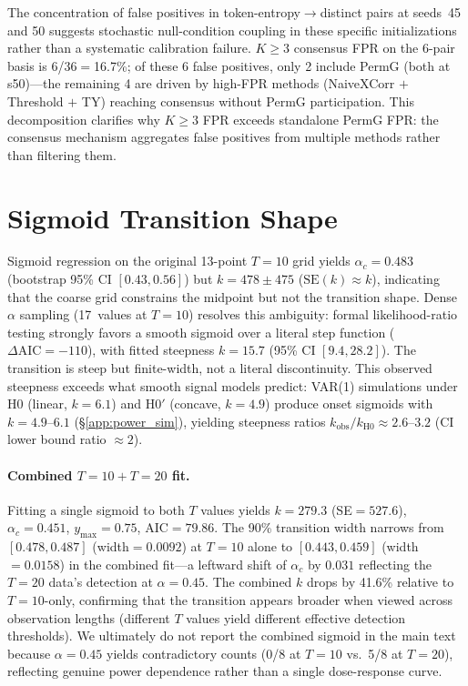 The concentration of false positives in token-entropy$\to$distinct pairs at seeds~45 and 50 suggests stochastic null-condition coupling in these specific initializations rather than a systematic calibration failure.
$K{\geq}3$ consensus FPR on the 6-pair basis is 6/36${=}$16.7\%; of these 6 false positives, only 2 include PermG (both at s50)---the remaining 4 are driven by high-FPR methods (NaiveXCorr $+$ Threshold $+$ TY) reaching consensus without PermG participation.
This decomposition clarifies why $K{\geq}3$ FPR exceeds standalone PermG FPR: the consensus mechanism aggregates false positives from multiple methods rather than filtering them.


\section{Sigmoid Transition Shape}
\label{app:sigmoid_shape}

Sigmoid regression on the original 13-point $T{=}10$ grid yields $\alpha_c = 0.483$ (bootstrap 95\% CI $[0.43, 0.56]$) but $k = 478 \pm 475$ ($\mathrm{SE}(k) \approx k$), indicating that the coarse grid constrains the midpoint but not the transition shape.
Dense $\alpha$ sampling (17~values at $T{=}10$) resolves this ambiguity: formal likelihood-ratio testing strongly favors a smooth sigmoid over a literal step function ($\Delta\mathrm{AIC}{=}-110$), with fitted steepness $k{=}15.7$ (95\% CI $[9.4, 28.2]$).
The transition is steep but finite-width, not a literal discontinuity.
This observed steepness exceeds what smooth signal models predict: VAR(1) simulations under H0 (linear, $k{=}6.1$) and H0$'$ (concave, $k{=}4.9$) produce onset sigmoids with $k{=}4.9$--$6.1$ (\S\ref{app:power_sim}), yielding steepness ratios $k_{\mathrm{obs}} / k_{\mathrm{H0}} \approx 2.6$--$3.2$ (CI lower bound ratio ${\approx}2$).

\paragraph{Combined $T{=}10 + T{=}20$ fit.}
Fitting a single sigmoid to both $T$ values yields $k{=}279.3$ (SE${=}527.6$), $\alpha_c{=}0.451$, $y_{\max}{=}0.75$, AIC${=}79.86$.
The 90\% transition width narrows from $[0.478, 0.487]$ (width$=0.0092$) at $T{=}10$ alone to $[0.443, 0.459]$ (width$=0.0158$) in the combined fit---a leftward shift of $\alpha_c$ by $0.031$ reflecting the $T{=}20$ data's detection at $\alpha{=}0.45$.
The combined $k$ drops by 41.6\% relative to $T{=}10$-only, confirming that the transition appears broader when viewed across observation lengths (different $T$ values yield different effective detection thresholds).
We ultimately do not report the combined sigmoid in the main text because $\alpha{=}0.45$ yields contradictory counts (0/8 at $T{=}10$ vs.\ 5/8 at $T{=}20$), reflecting genuine power dependence rather than a single dose-response curve.

